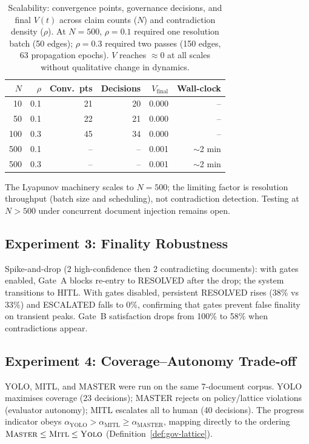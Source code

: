 \documentclass[11pt]{article}
\newcommand{\tsc}[1]{\textnormal{\textsc{#1}}}
\begin{document}
\begin{table}[H]
\centering
\small
\begin{tabular}{rrrrrr}
\toprule
$N$ & $\rho$ & \textbf{Conv.\ pts} & \textbf{Decisions} & \textbf{$V_{\text{final}}$} & \textbf{Wall-clock} \\
\midrule
10  & 0.1 & 21 & 20 & 0.000 & -- \\
50  & 0.1 & 22 & 21 & 0.000 & -- \\
100 & 0.3 & 45 & 34 & 0.000 & -- \\
500 & 0.1 & -- & -- & 0.001 & $\sim$2 min \\
500 & 0.3 & -- & -- & 0.001 & $\sim$2 min \\
\bottomrule
\end{tabular}
\caption{Scalability: convergence points, governance decisions, and final $V(t)$ across claim counts ($N$) and contradiction density ($\rho$).
At $N{=}500$, $\rho{=}0.1$ required one resolution batch (50 edges); $\rho{=}0.3$ required two passes (150 edges, 63 propagation epochs).
$V$ reaches $\approx 0$ at all scales without qualitative change in dynamics.}
\label{tab:scalability}
\end{table}

The Lyapunov machinery scales to $N = 500$; the limiting factor is resolution throughput (batch size and scheduling), not contradiction detection.
Testing at $N > 500$ under concurrent document injection remains open.

\subsection{Experiment 3: Finality Robustness}

Spike-and-drop (2 high-confidence then 2 contradicting documents): with gates enabled, Gate~A blocks re-entry to RESOLVED after the drop; the system transitions to HITL.
With gates disabled, persistent RESOLVED rises (38\% vs 33\%) and ESCALATED falls to 0\%, confirming that gates prevent false finality on transient peaks.
Gate~B satisfaction drops from 100\% to 58\% when contradictions appear.

\subsection{Experiment 4: Coverage--Autonomy Trade-off}

YOLO, MITL, and MASTER were run on the same 7-document corpus.
YOLO maximises coverage (23 decisions); MASTER rejects on policy/lattice violations (evaluator autonomy); MITL escalates all to human (40 decisions).
The progress indicator obeys $\alpha_{\text{YOLO}} > \alpha_{\text{MITL}} \geq \alpha_{\text{MASTER}}$, mapping directly to the ordering $\tsc{Master} \leq \tsc{Mitl} \leq \tsc{Yolo}$ (Definition~\ref{def:gov-lattice}).
\end{document}
